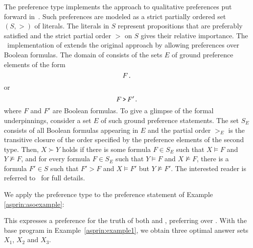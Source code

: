 The preference type  implements the approach to qualitative preferences put forward in~\cite{giumar12a}.
Such preferences are modeled as a strict partially ordered set
\(
(S,>)
\)
of literals.
The literals in $S$ represent propositions that are preferably satisfied
and the strict partial order $>$ on $S$ gives their relative importance.
%
The \asprin\ implementation of  extends the original approach by allowing preferences over Boolean formulas.
The domain of  consists of the sets $E$ of ground preference elements of the form
\[F\texttt{.}\]
or 
\[F \, \texttt{>} \, F'\texttt{.}\]
where $F$ and $F'$ are Boolean formulas.
%
To give a glimpse of the formal underpinnings,
consider a set $E$ of such ground preference statements.
The set $S_E$ consists of all Boolean formulas appearing in $E$
and the partial order $>_E$ is the transitive closure of the order 
specified by the preference elements of the second type. 
Then, $X \succ Y$ holds if 
there is some formula $F \in S_E$ such that $X \models F$ and $Y \not\models F$, 
and for every formula $F \in S_E$ such that $Y \models F$ and $X \not\models F$, 
there is a formula
$F'\in S$ such that $F'>F$ and $X \models F'$ but $Y \not\models F'$.  The interested reader is referred to~\cite{giumar12a} for full details.  %
\begin{example}
%
%
We apply the preference type  to the preference statement of Example \ref{asprin:asoexample}:
%

%
This expresses a preference for the truth of both  and , 
preferring \code{a/1} over \code{b/1}.
With the base program in Example~\ref{asprin:example1}, 
we obtain three optimal answer sets $X_1$, $X_2$ and $X_3$.  
\end{example} %


